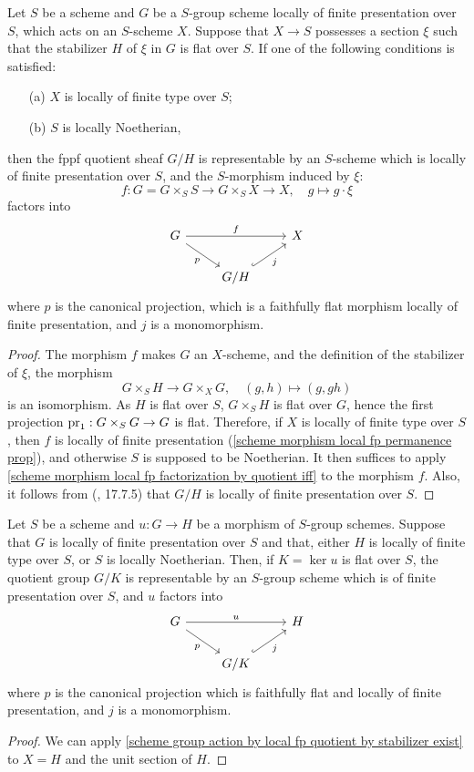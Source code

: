 \begin{theorem}\label{scheme group action by local fp quotient by stabilizer exist}
Let $S$ be a scheme and $G$ be a $S$-group scheme locally of finite presentation over $S$, which acts on an $S$-scheme $X$. Suppose that $X\to S$ possesses a section $\xi$ such that the stabilizer $H$ of $\xi$ in $G$ is flat over $S$. If one of the following conditions is satisfied:
\begin{enumerate}
    \item[(a)] $X$ is locally of finite type over $S$;
    \item[(b)] $S$ is locally Noetherian,
\end{enumerate}
then the fppf quotient sheaf $G/H$ is representable by an $S$-scheme which is locally of finite presentation over $S$, and the $S$-morphism induced by $\xi$:
\[f:G=G\times_SS\to G\times_SX\to X,\quad g\mapsto g\cdot\xi\]
factors into
\[\begin{tikzcd}
G\ar[rd,swap,"p"]\ar[rr,"f"]&&X\\
&G/H\ar[ru,hook,swap,"j"]&
\end{tikzcd}\]
where $p$ is the canonical projection, which is a faithfully flat morphism locally of finite presentation, and $j$ is a monomorphism.
\end{theorem}
\begin{proof}
The morphism $f$ makes $G$ an $X$-scheme, and the definition of the stabilizer of $\xi$, the morphism
\[G\times_SH\to G\times_XG,\quad (g,h)\mapsto (g,gh)\]
is an isomorphism. As $H$ is flat over $S$, $G\times_SH$ is flat over $G$, hence the first projection $\mathrm{pr}_1:G\times_SG\to G$ is flat. Therefore, if $X$ is locally of finite type over $S$, then $f$ is locally of finite presentation (\cref{scheme morphism local fp permanence prop}), and otherwise $S$ is supposed to be Noetherian. It then suffices to apply \cref{scheme morphism local fp factorization by quotient iff} to the morphism $f$. Also, it follows from (\cite{EGA4-4}, 17.7.5) that $G/H$ is locally of finite presentation over $S$.
\end{proof}

\begin{corollary}\label{scheme group morphism factorization by quotient if flat}
Let $S$ be a scheme and $u:G\to H$ be a morphism of $S$-group schemes. Suppose that $G$ is locally of finite presentation over $S$ and that, either $H$ is locally of finite type over $S$, or $S$ is locally Noetherian. Then, if $K=\ker u$ is flat over $S$, the quotient group $G/K$ is representable by an $S$-group scheme which is of finite presentation over $S$, and $u$ factors into
\[\begin{tikzcd}
G\ar[rd,swap,"p"]\ar[rr,"u"]&&H\\
&G/K\ar[ru,hook,swap,"j"]&
\end{tikzcd}\]
where $p$ is the canonical projection which is faithfully flat and locally of finite presentation, and $j$ is a monomorphism.
\end{corollary}
\begin{proof}
We can apply \cref{scheme group action by local fp quotient by stabilizer exist} to $X=H$ and the unit section of $H$.
\end{proof}

